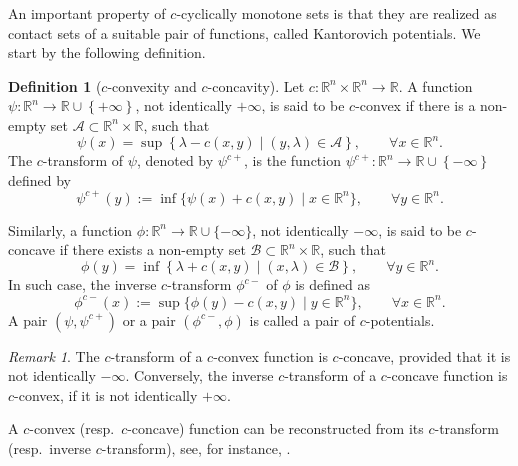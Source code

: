 \documentclass[reqno]{amsart}
\theoremstyle{plain}
\theoremstyle{definition}
\newtheorem{Def}[thm]{Definition}
\theoremstyle{remark}
\newtheorem{rem}[thm]{Remark}
\begin{document}
An important property of $c$-cyclically monotone sets is that they are realized as contact sets of a suitable pair of functions, called Kantorovich potentials. 
	We start by the following definition.
	\begin{Def}[$c$-convexity and $c$-concavity]\label{c-convexity}
		Let $c:\mathbb{R}^n\times\mathbb{R}^n\to\mathbb{R}$.
		A function $\psi:\mathbb{R}^n\to\mathbb{R}\cup\left\{+\infty\right\}$, not identically $+\infty$, is said to be $c$-convex if there is a non-empty set $\mathcal{A}\subset\mathbb{R}^n\times\mathbb{R}$, such that
		\begin{equation}\label{def_c_convex}
			\psi(x)=\sup\left\{\lambda-c(x,y)\;|\;(y,\lambda)\in\mathcal{A}\right\},\qquad\forall x\in\mathbb{R}^n.
		\end{equation}
		The $c$-transform of $\psi$, denoted by $\psi^{c+}$, is the function $\psi^{c+}:\mathbb{R}^n\to\mathbb{R}\cup\left\{-\infty\right\}$ defined by 
		\begin{equation}
			\psi^{c+}(y):=\inf\{\psi(x)+c(x,y)\mid x\in\mathbb{R}^n\},\qquad\forall y\in\mathbb{R}^n.
		\end{equation}
		 
	Similarly, a function $\phi:\mathbb{R}^n\to\mathbb{R}\cup\{-\infty\}$, not identically $-\infty$, is said to be $c$-concave if there exists a non-empty set $\mathcal{B}\subset\mathbb{R}^n\times\mathbb{R}$, such that
	\begin{equation}
		\phi(y)=\inf\left\{\lambda+c(x,y)\;|\;(x,\lambda)\in\mathcal{B}\right\},\qquad\forall y\in\mathbb{R}^n.
	\end{equation}
	In such case, the inverse $c$-transform $\phi^{c-}$ of $\phi$ is defined as 
	\begin{equation}
		\phi^{c-}(x):=\sup\{\phi(y)-c(x,y)\mid y\in\mathbb{R}^n\},\qquad\forall x\in\mathbb{R}^n.
	\end{equation}
	A pair $\left(\psi,\psi^{c+}\right)$ or a pair $(\phi^{c-},\phi)$ is called a pair of $c$-potentials.
	\end{Def}
	\begin{rem}
		The $c$-transform of a $c$-convex function is $c$-concave, provided that it is not identically $-\infty$. Conversely, the inverse $c$-transform of a $c$-concave function is $c$-convex, if it is not identically $+\infty$.
	\end{rem}
A $c$-convex (resp.\ $c$-concave) function can be reconstructed from its $c$-transform (resp.\ inverse $c$-transform), see, for instance, \cite[Proposition 3.5]{RiffSrOptTrans}.
\end{document}
